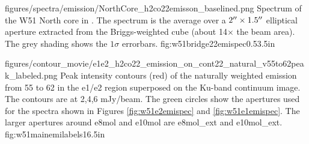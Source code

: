 



\Figure
{{figures/spectra/emission/NorthCore_h2co22emisson_baselined}.png}
{Spectrum of the W51 North core in \ortho \twotwo.  The spectrum
is the average over a $2\mbox{$^{\prime\prime}$}\times1.5\mbox{$^{\prime\prime}$}$ elliptical aperture extracted
from the Briggs-weighted cube (about 14$\times$ the beam area).  The grey
shading shows the $1\sigma$
errorbars.
}
{fig:w51bridge22emispec}{0.5}{3.5in}

\Figure
{figures/contour_movie/e1e2_h2co22_emission_on_cont22_natural_v55to62peak_labeled.png}
{ Peak intensity contours (red) of the naturally weighted \formaldehyde \twotwo
emission from 55 to 62 \kms in the e1/e2 region superposed on the Ku-band
continuum image.  The contours are at 2,4,6 mJy/beam.  The green circles show
the apertures used for the spectra shown in Figures
\ref{fig:w51e2emispec} and
\ref{fig:w51e1emispec}.  The larger apertures around e8mol and e10mol are
e8mol\_ext and e10mol\_ext.
}{fig:w51mainemilabels}{1}{6.5in}

